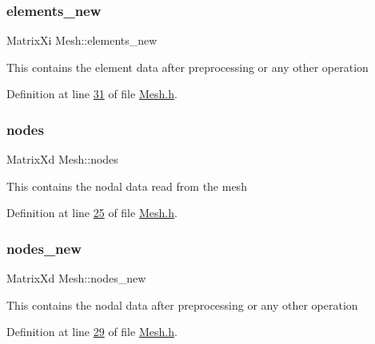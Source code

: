 \mbox{\label{class_mesh_a8e099460dded463a5c13fb8d6066d312}} 
\subsubsection{\texorpdfstring{elements\+\_\+new}{elements\_new}}
{\footnotesize\ttfamily Matrix\+Xi Mesh\+::elements\+\_\+new\hspace{0.3cm}{\ttfamily [private]}}

This contains the element data after preprocessing or any other operation 

Definition at line \hyperlink{_mesh_8h_source_l00031}{31} of file \hyperlink{_mesh_8h_source}{Mesh.\+h}.

\mbox{\label{class_mesh_aa143447b8630a7a8bf2b045fddf372c3}} 
\subsubsection{\texorpdfstring{nodes}{nodes}}
{\footnotesize\ttfamily Matrix\+Xd Mesh\+::nodes\hspace{0.3cm}{\ttfamily [private]}}

This contains the nodal data read from the mesh 

Definition at line \hyperlink{_mesh_8h_source_l00025}{25} of file \hyperlink{_mesh_8h_source}{Mesh.\+h}.

\mbox{\label{class_mesh_aa9cae59f50d13339ed395ef567401cb8}} 
\subsubsection{\texorpdfstring{nodes\+\_\+new}{nodes\_new}}
{\footnotesize\ttfamily Matrix\+Xd Mesh\+::nodes\+\_\+new\hspace{0.3cm}{\ttfamily [private]}}

This contains the nodal data after preprocessing or any other operation 

Definition at line \hyperlink{_mesh_8h_source_l00029}{29} of file \hyperlink{_mesh_8h_source}{Mesh.\+h}.

\mbox{\label{class_mesh_a602850c13e7383308be4e65acd5b30fe}} 
